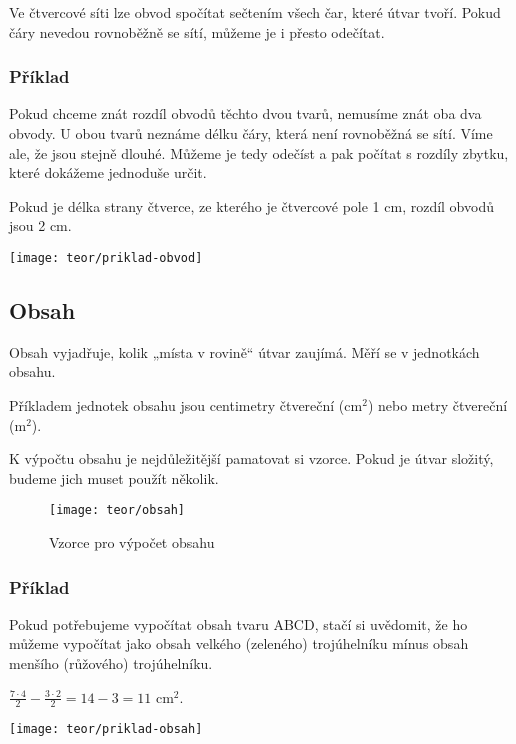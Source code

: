 Ve čtvercové síti lze obvod spočítat sečtením všech čar, které útvar tvoří. Pokud čáry nevedou rovnoběžně se sítí, můžeme je i přesto odečítat.

\subsubsection{Příklad}
\begin{minipage}[t]{\linewidth}
    Pokud chceme znát rozdíl obvodů těchto dvou tvarů, nemusíme znát oba dva obvody. U obou tvarů neznáme délku čáry, která není rovnoběžná se sítí. Víme ale, že jsou stejně dlouhé. Můžeme je tedy odečíst a pak počítat s rozdíly zbytku, které dokážeme jednoduše určit.

    Pokud je délka strany čtverce, ze kterého je čtvercové pole 1 cm, rozdíl obvodů jsou 2 cm.
    \begin{center}
        \texttt{[image: teor/priklad-obvod]}
    \end{center}
\end{minipage}

\subsection{Obsah}
Obsah vyjadřuje, kolik „místa v rovině“ útvar zaujímá. Měří se v jednotkách obsahu.~\cite{umim_mat}

Příkladem jednotek obsahu jsou centimetry čtvereční ($\text{cm}^{2}$) nebo metry čtvereční ($\text{m}^{2}$).



K výpočtu obsahu je nejdůležitější pamatovat si vzorce. Pokud je útvar složitý, budeme jich muset použít několik.

\begin{figure}[h]
	\centering
	\texttt{[image: teor/obsah]}
	\caption{Vzorce pro výpočet obsahu~\cite{umim_mat}}
\end{figure}

\subsubsection{Příklad}
\begin{minipage}[t]{\linewidth}
    Pokud potřebujeme vypočítat obsah tvaru ABCD, stačí si uvědomit, že ho můžeme vypočítat jako obsah velkého (zeleného) trojúhelníku mínus obsah menšího (růžového) trojúhelníku.

    $ \frac{7\cdot4}{2} - \frac{3\cdot2}{2} =  14 - 3 = 11 \text{ cm}^{2}$.
    \begin{center}
        \texttt{[image: teor/priklad-obsah]}
    \end{center}
\end{minipage}

